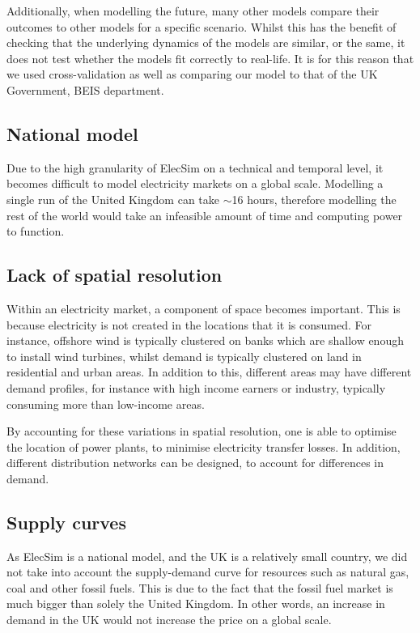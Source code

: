 Additionally, when modelling the future, many other models compare their outcomes to other models for a specific scenario. Whilst this has the benefit of checking that the underlying dynamics of the models are similar, or the same, it does not test whether the models fit correctly to real-life. It is for this reason that we used cross-validation as well as comparing our model to that of the UK Government, BEIS department.

\subsection{National model}

Due to the high granularity of ElecSim on a technical and temporal level, it becomes difficult to model electricity markets on a global scale. Modelling a single run of the United Kingdom can take ${\sim}$16 hours, therefore modelling the rest of the world would take an infeasible amount of time and computing power to function. 

\subsection{Lack of spatial resolution}

Within an electricity market, a component of space becomes important. This is because electricity is not created in the locations that it is consumed. For instance, offshore wind is typically clustered on banks which are shallow enough to install wind turbines, whilst demand is typically clustered on land in residential and urban areas. In addition to this, different areas may have different demand profiles, for instance with high income earners or industry, typically consuming more than low-income areas.

By accounting for these variations in spatial resolution, one is able to optimise the location of power plants, to minimise electricity transfer losses. In addition, different distribution networks can be designed, to account for differences in demand.


\subsection{Supply curves}

As ElecSim is a national model, and the UK is a relatively small country, we did not take into account the supply-demand curve for resources such as natural gas, coal and other fossil fuels. This is due to the fact that the fossil fuel market is much bigger than solely the United Kingdom. In other words, an increase in demand in the UK would not increase the price on a global scale. 

